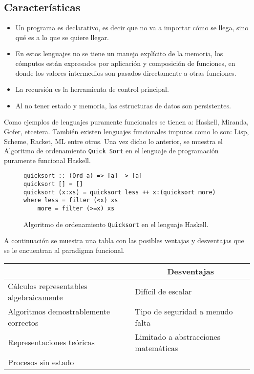 \documentclass[12pt, oneside]{article}
\begin{document}
\subsection*{Características}

\begin{itemize}
	\item Un programa es declarativo, es decir que no va a importar cómo se llega, sino qué es a lo que se quiere llegar.
	\item En estos lenguajes no se tiene un manejo explícito de la memoria, los cómputos están expresados por aplicación y composición de funciones, en donde los valores intermedios son pasados directamente a otras funciones.
	\item La recursión es la herramienta de control principal\cite{favio_notas}.
	\item Al no tener estado y memoria, las estructuras de datos son persistentes.
\end{itemize} 

Como ejemplos de lenguajes puramente funcionales se tienen a: Haskell, Miranda, Gofer, etcetera. También existen lenguajes funcionales impuros como lo son: Lisp, Scheme, Racket, ML entre otros. 
Una vez dicho lo anterior, se muestra el Algoritmo de ordenamiento {\tt Quick Sort} en el lenguaje de programación puramente funcional Haskell\cite{javo_notas}.

\begin{figure}[H]
\begin{verbatim}
quicksort :: (Ord a) => [a] -> [a]
quicksort [] = []
quicksort (x:xs) = quicksort less ++ x:(quicksort more)
where less = filter (<x) xs
	more = filter (>=x) xs
\end{verbatim}
\caption{Algoritmo de ordenamiento {\tt Quicksort} en el lenguaje Haskell.}
\label{}
\end{figure}

A continuación se muestra una tabla con las posibles ventajas y desventajas que se le encuentran al paradigma funcional.

\begin{table}[H]
\centering
\renewcommand{\arraystretch}{1.5}
	\begin{tabular}{| l | l |}
		\hline
		\rowcolor{lightgray}
		\multicolumn{1}{|c|}{{\bf Ventajas}} & \multicolumn{1}{|c|}{{\bf Desventajas}} \\
		\hline
		Cálculos representables algebraicamente& Difícil de escalar \\
		\hline
		Algoritmos demostrablemente correctos & Tipo de seguridad a menudo falta \\
		\hline
		Representaciones teóricas & Limitado a abstracciones matemáticas \\
		\hline
		Procesos sin estado &  \\ \hline
	\end{tabular}
\renewcommand{\arraystretch}{1}
\end{table}
\end{document}
